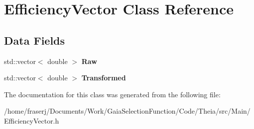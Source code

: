 \hypertarget{classEfficiencyVector}{}\section{Efficiency\+Vector Class Reference}
\label{classEfficiencyVector}
\subsection*{Data Fields}
\begin{DoxyCompactItemize}
\item 
\mbox{\label{classEfficiencyVector_a138e823e4829aadd9e43b475848804cf}} 
std\+::vector$<$ double $>$ {\bfseries Raw}
\item 
\mbox{\label{classEfficiencyVector_af4687a6e7c72f35b35310e2368335b25}} 
std\+::vector$<$ double $>$ {\bfseries Transformed}
\end{DoxyCompactItemize}


The documentation for this class was generated from the following file\+:\begin{DoxyCompactItemize}
\item 
/home/fraserj/\+Documents/\+Work/\+Gaia\+Selection\+Function/\+Code/\+Theia/src/\+Main/Efficiency\+Vector.\+h\end{DoxyCompactItemize}
